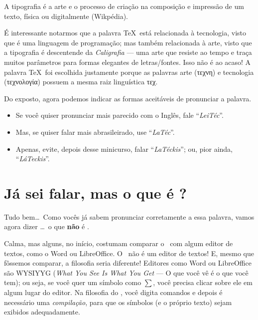 A tipografia é a arte e o processo de criação na composição e impressão de um texto, física ou digitalmente (Wikpédia).

É interessante notarmos que a palavra \TeX\ está relacionada à 
\textsf{tecnologia}, visto que é uma linguagem de programação; mas também 
relacionada à \textsf{arte}, visto que a tipografia é descentende da 
\textit{Caligrafia} --- uma arte que resiste ao tempo e traça muitos parâmetros para formas elegantes de letras/fontes.
Isso não é ao acaso!
A palavra \TeX\ foi escolhida justamente porque as palavras \textsf{arte} 
({\grega τεχνη}) e \textsf{tecnologia} ({\grega τεχνολογία}) possuem a mesma raiz linguística {\grega τεχ}. 

Do exposto, agora podemos indicar as formas aceitáveis de pronunciar a palavra\LaTeXX.

\begin{itemize}
  \item[\emoji{speaking-head}] Se você quiser pronunciar mais parecido com o        Inglês, fale ``\textit{LeiTéc}''. 
  \item[\emoji{speaking-head}] Mas, se quiser falar mais abrasileirado, use 
        ``\textit{LaTéc}''.
  \item[\emoji{prohibited}] Apenas, evite, depois desse minicurso, falar 
        ``\textit{LaTéckis}''; ou, pior ainda, ``\textit{LáTeckis}''. 
\end{itemize}


\section{Já sei falar, mas o que é \LaTeXX?}
\label{sec:word-latex}

Tudo bem\ldots\
Como vocês já sabem pronunciar corretamente a essa palavra, vamos agora
dizer \ldots\ o que \textbf{não} é \LaTeXX. 

Calma, mas alguns, no início, costumam comparar o \LaTeXX\ com algum editor 
de textos, como o Word ou LibreOffice. 
O \LaTeXX\ não é um editor de textos!
E, mesmo que fôssemos comparar, a filosofia seria diferente!
Editores como Word ou LibreOffice são \textsf{WYSIYYG} (\textit{What You See Is What You Get} --- O que você vê é o que você tem); ou seja, se você 
quer um símbolo como $\sum$, você precisa clicar sobre ele em algum lugar
do editor.
Na filosofia do \LaTeXX, você digita comandos e depois é necessário uma 
\textit{compilação}, para que os símbolos (e o próprio texto) sejam 
exibidos adequadamente.

